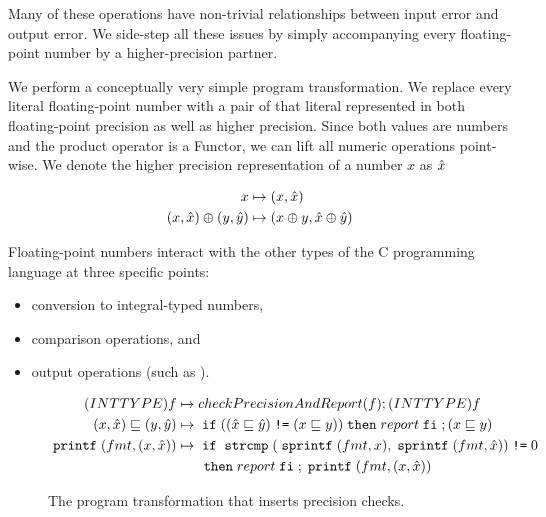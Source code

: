 Many of these operations have non-trivial relationships between input error and output error. We side-step all these issues by simply
accompanying every floating-point number by a higher-precision partner.

We perform a conceptually very simple program transformation. We replace every literal floating-point number with a pair of that literal represented in both floating-point precision as well as higher precision. Since both values are numbers and the product operator is a Functor, we can lift all numeric operations point-wise. We denote the higher precision representation of a number $x$ as $\hat{x}$

\begin{align*}
    x &\mapsto (x, \hat{x}) \\
    (x, \hat{x}) \oplus (y, \hat{y}) &\mapsto (x \oplus y,\hat{x} \oplus \hat{y})
\end{align*}

Floating-point numbers interact with the other types of the C programming language at three specific points:

\begin{itemize}
\item conversion to integral-typed numbers,
\item comparison operations, and
\item output operations (such as ).
\end{itemize}

\begin{figure*}
\centering

\begin{align*}
    (INTTYPE)f &\mapsto checkPrecisionAndReport(f) ; (INTTYPE)f \\
    (x, \hat{x}) \sqsubseteq (y, \hat{y})  &\mapsto \;\texttt{if}\; ((\hat{x} \sqsubseteq \hat{y}) \;\texttt{!=}\; (x \sqsubseteq y)) \;\texttt{then}\; report \;\texttt{fi}\; ; (x \sqsubseteq y) \\
    \;\texttt{printf}\;(fmt,(x, \hat{x})) &\mapsto \;\texttt{if}\; \;\texttt{strcmp}\;(\;\texttt{sprintf}\;(fmt, x), \;\texttt{sprintf}\;(fmt,\hat{x})) \;\texttt{!=}\;
    0 \\
    & \;\;\;\;\;\; \;\texttt{then}\; report \;\texttt{fi}\; ; \;\texttt{printf}\;(fmt,(x, \hat{x})) \\
\end{align*}

\caption{The program transformation that inserts precision checks.}
\label{fig:checkPrecision}
\end{figure*}

